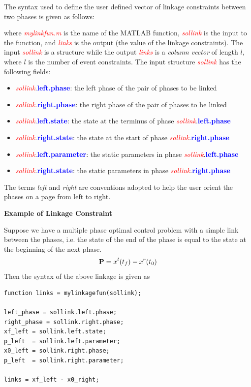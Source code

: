 \documentclass[10pt]{article}
\newenvironment{shadedframe}{%
  \def\FrameCommand{\fcolorbox{black}{shadecolor}}%
  \MakeFramed {\FrameRestore}}
{\endMakeFramed}
\newcommand{\bfblue}[1]{\textcolor{blue}{\bf #1}}
\newcommand{\slred}[1]{\textcolor{red}{\sl #1}}
\begin{document}
The syntax used to define the user defined vector of linkage constraints between two phases is given as follows:
\begin{center}
\end{center}
{\noindent}where \slred{mylinkfun.m} is the name of the MATLAB function,
\slred{sollink} is the input to the function, and \slred{links} is the output (\ie the value of the linkage
constraints).  The input \slred{sollink} is a structure while the output \slred{links} is a {\em column vector} of length $l$,
where $l$ is the number of event constraints. The input structure \slred{sollink} has the following fields:
\begin{itemize}
  \item \slred{sollink}.\bfblue{left.phase}:  the left phase of the
    pair of phases to be linked
  \item \slred{sollink}.\bfblue{right.phase}:  the right phase of the pair of phases to be linked
  \item \slred{sollink}.\bfblue{left.state}: the state at the terminus of phase \slred{sollink}.\bfblue{left.phase}
  \item \slred{sollink}.\bfblue{right.state}: the state at the start of phase \slred{sollink}.\bfblue{right.phase}
  \item \slred{sollink}.\bfblue{left.parameter}: the static parameters in phase \slred{sollink}.\bfblue{left.phase}
  \item \slred{sollink}.\bfblue{right.state}: the static parameters in phase \slred{sollink}.\bfblue{right.phase}
\end{itemize}
The terms {\em left} and {\em right} are conventions adopted to help
the user orient the phases on a page from left to right.

\scriptsize
\begin{shadedframe}
{\noindent}{\bf Example of Linkage Constraint}
\vspace{12pt}

{\noindent}Suppose we have a multiple phase optimal control problem with a simple link between the phases, i.e. the state of the end of the phase is equal to the state at the beginning of the next phase.  \begin{displaymath}
\mathbf{P} = x^l(t_f) - x^r(t_0)
\end{displaymath}
Then the syntax of the above linkage is given as
\begin{verbatim}
function links = mylinkagefun(sollink);

left_phase = sollink.left.phase;
right_phase = sollink.right.phase;
xf_left = sollink.left.state;
p_left  = sollink.left.parameter;
x0_left = sollink.right.phase;
p_left  = sollink.right.parameter;

links = xf_left - x0_right;
\end{verbatim}
\end{shadedframe}
\normalsize
\end{document}
